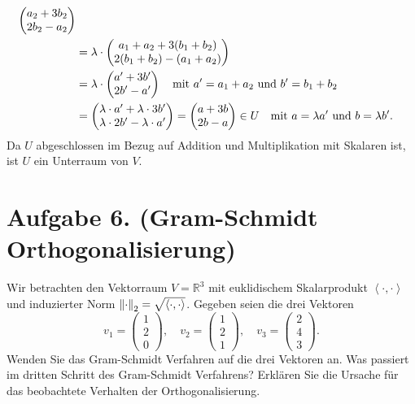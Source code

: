 \documentclass[german,12pt]{homework}
\newcommand{\RR}{\mathbb{R}}
\newcommand{\dotproduct}[2]{\left\langle#1, #2\right\rangle}
\DeclarePairedDelimiter{\norm}{\lVert}{\rVert}
\DeclarePairedDelimiter{\enbrace}{(}{)}
\begin{document}
\begin{enumerate}
\begin{align*}
{            \begin{pmatrix}a_2 + 3b_2\\2b_2 - a_2\end{pmatrix}}\\
            &= \lambda \cdot \begin{pmatrix}
                a_1 + a_2 + 3\enbrace*{b_1 + b_2}\\2\enbrace*{b_1 + b_2} -
                \enbrace*{a_1 + a_2}
            \end{pmatrix}\\
            &= \lambda \cdot \begin{pmatrix}
                a' + 3b'\\2b' - a'
            \end{pmatrix} \quad \text{mit }a' = a_1 + a_2\text{ und }b' = b_1 +
            b_2\\
            &= \begin{pmatrix}
                \lambda \cdot a' + \lambda \cdot 3b'\\
                \lambda \cdot 2b' - \lambda \cdot a'
            \end{pmatrix} = \begin{pmatrix}
                a + 3b\\2b - a
            \end{pmatrix} \in U \quad \text{mit }a = \lambda{a'}\text{ und }b =
            \lambda{b'}.
        \end{align*}
        Da \(U\) abgeschlossen im Bezug auf Addition und Multiplikation mit
        Skalaren ist, ist \(U\) ein Unterraum von \(V\).
    \end{enumerate}

    \section*{Aufgabe 6. (Gram-Schmidt Orthogonalisierung)}

    \begin{problem}
        Wir betrachten den Vektorraum \(V = \RR^3\) mit euklidischem
        Skalarprodukt \(\dotproduct{\cdot}{\cdot}\) und induzierter Norm
        \(\norm*{\cdot}_2 = \sqrt{\dotproduct{\cdot}{\cdot}}\). Gegeben seien
        die drei Vektoren
        \[v_1 = \begin{pmatrix}1\\2\\0\end{pmatrix}, \quad v_2 =
        \begin{pmatrix}1\\2\\1\end{pmatrix}, \quad v_3 =
        \begin{pmatrix}2\\4\\3\end{pmatrix}.\]
        Wenden Sie das Gram-Schmidt Verfahren auf die drei Vektoren an. Was
        passiert im dritten Schritt des Gram-Schmidt Verfahrens? Erklären Sie
        die Ursache für das beobachtete Verhalten der Orthogonalisierung.
    \end{problem}
\end{document}
